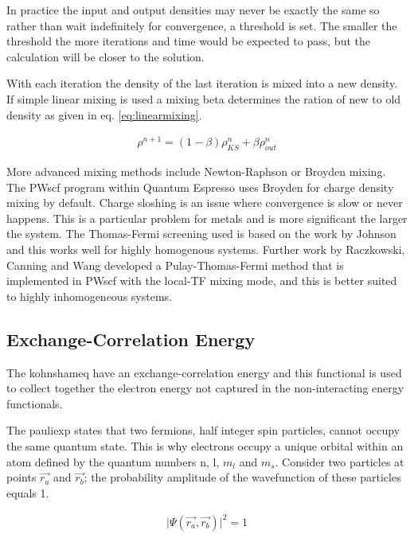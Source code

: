 In practice the input and output densities may never be exactly the same so rather than wait indefinitely for convergence, a threshold is set.  The smaller the threshold the more iterations and time would be expected to pass, but the calculation will be closer to the solution.

With each iteration the density of the last iteration is mixed into a new density.  If simple linear mixing is used a mixing beta determines the ration of new to old density as given in eq. \ref{eq:linearmixing}\cite{jfannett1996}.

\begin{equation}
\begin{split}
\rho^{n+1} = (1 - \beta) \rho_{KS}^{n} + \beta \rho_{out}^{n}
\end{split}
\label{eq:linearmixing}
\end{equation}

More advanced mixing methods include Newton-Raphson or Broyden mixing.  The PWscf program within Quantum Espresso uses Broyden for charge density mixing by default.  Charge sloshing is an issue where convergence is slow or never happens.  This is a particular problem for metals\cite{chargesloshing2} and is more significant the larger the system\cite{localtf}.  The Thomas-Fermi screening used is based on the work by Johnson\cite{thomasfermijohnson} and this works well for highly homogenous systems.  Further work by Raczkowski, Canning and Wang\cite{localtf} developed a Pulay-Thomas-Fermi method that is implemented in PWscf with the local-TF mixing mode, and this is better suited to highly inhomogeneous systems.

\FloatBarrier
\subsection{Exchange-Correlation Energy}

The \Gls{kohnshameq} have an exchange-correlation energy and this functional is used to collect together the electron energy not captured in the non-interacting energy functionals.

The \Gls{pauliexp} states that two \gls{fermion}s, half integer spin particles, cannot occupy the same quantum state.  This is why electrons occupy a unique orbital within an atom defined by the quantum numbers n, l, $m_l$ and $m_s$.  Consider two particles at points $\vec{r_a}$ and $\vec{r_b}$; the probability amplitude of the wavefunction of these particles equals 1.

\begin{equation}
  \begin{split}
    \lvert \Psi(\vec{r_a}, \vec{r_b}) \rvert ^2 = 1
  \end{split}
  \label{eq:eqEulersFormula}
\end{equation}

